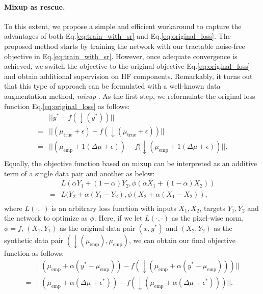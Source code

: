 \documentclass[letterpaper]{article} %
\begin{document}
\paragraph{Mixup as rescue.}
To this extent, we propose a simple and efficient workaround to capture the advantages of both Eq.\eqref{eq:train_with_sr} and Eq.\eqref{eq:original_loss}. The proposed method starts by training the network with our tractable noise-free objective in Eq.\eqref{eq:train_with_sr}. However, once adequate convergence is achieved, we switch the objective to the original objective Eq.\eqref{eq:original_loss} and obtain additional supervision on HF components.
%
Remarkably, it turns out that this type of approach can be formulated with a well-known data augmentation method, \textit{mixup} \cite{mixup}. As the first step, we reformulate the original loss function Eq.\eqref{eq:original_loss} as follows:
\begin{equation}\label{eq:original_loss_in_mixupform}
    \begin{aligned}
        &||y^* - f(\downarrow(y^*))|| \\
        =&||(\mu_{\text{true}} + \epsilon) - f(\downarrow(\mu_{\text{true}} + \epsilon))|| \\
        =&||(\mu_{\text{emp}}+ 1(\Delta\mu+\epsilon)) - f(\downarrow(\mu_{\text{emp}} + 1(\Delta\mu+\epsilon))||. \\
    \end{aligned}
\end{equation}
Equally, the objective function based on mixup can be interpreted as an additive term of a single data pair and another as below:
\begin{equation}
    \begin{aligned}
        &L(\alpha Y_1 + (1-\alpha) Y_2, \phi(\alpha X_1 + (1-\alpha) X_2)) \\
        =&L(Y_2 + \alpha (Y_1 - Y_2), \phi(X_2 + \alpha (X_1 - X_2)), \\
    \end{aligned}
\end{equation}
where $L(\cdot,\cdot)$ is an arbitrary loss function with inputs $X_1, X_2$, targets $Y_1, Y_2$ and the network to optimize as $\phi$. Here, if we let $L(\cdot,\cdot)$ as the pixel-wise norm, $\phi=f$, $(X_1, Y_1)$ as the original data pair $(x, y^*)$ and $(X_2, Y_2)$ as the synthetic data pair $(\downarrow(\mu_\text{emp}),\mu_\text{emp})$, we can obtain our final objective function as follows:
\begin{equation}
    \label{eq:final_w_mixup}
    \begin{aligned}
        &||(\mu_{\text{emp}}+ \alpha(y^* - \mu_{\text{emp}})) - f(\downarrow(\mu_{\text{emp}}+ \alpha(y^* - \mu_{\text{emp}})))|| \\
        =&||(\mu_{\text{emp}}+ \alpha(\Delta\mu+\epsilon^*)) - f(\downarrow(\mu_{\text{emp}} + \alpha(\Delta\mu+\epsilon^*)))||
        .
    \end{aligned}
\end{equation}
\end{document}
